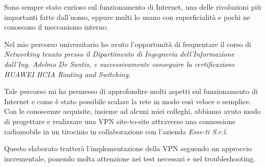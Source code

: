 \begin{flushleft}
\begin{comment}
Il lettore deve capire dal sommario l'ambito di applicazione del progetto svolto, la problematica esaminata, i metodi e gli algoritmi utilizzati per realizzare il progetto e risolvere gli eventuali problemi incontrati, i risultati ottenuti.

Dalla lettura del sommario il lettore deve comprendere se, per i suoi scopi, può essere utile proseguire o meno la lettura, ovvero se gli argomenti descritti rispondono alle sue necessità. Pensiamo, ad esempio, si pensi a un lettore che sia un laureando che si trova ad affrontare un progetto su temi o ambiti di applicazione collegati: vale la pena leggere questo elaborato?



\end{comment}


\begin{comment}

scaletta
prima parte
  sempre stato curioso su come funziona internet
  è un sistema complesso eppure lo usano tutti senza sapere cos'è
  fatto la certificazione HUAWEI per que
seconda parte
  in sto coso ci concentrimao sull'implementazione della vpn
  con vari test del funzionamento e bla bla


\end{comment}

Sono sempre stato curioso sul funzionamento di Internet, una delle rivoluzioni più importanti fatte dall'uomo, eppure multi lo usano con superficialità e pochi ne conoscono il meccanismo interno. 

Nel mio percorso universitario ho avuto l'opportunità di frequentare il corso di \it{Networking} tenuto presso il Dipartimento di Ingegneria dell’Informazione dall’Ing. Adelmo De Santis, e successivamente conseguire la certificazione \textit{HUAWEI HCIA Routing and Switching}. 

Tale percorso mi ha permesso di approfondire molti aspetti sul funzionamento di Internet e come è stato possibile scalare la rete in modo così veloce e semplice. Con le conoscenze acquisite, insieme ad alcuni miei colleghi, abbiamo avuto modo di progettare e realizzare una VPN site-to-site attraverso una connessione radiomobile in un tirocinio in collaborazione con l'azienda \textit{Esse-ti S.r.l.}

Questo elaborato tratterà l'implementazione della VPN seguendo un approccio incrementale, ponendo molta attenzione nei test necessari e nel troubleshooting.





\end{flushleft}



\vfill
\newpage